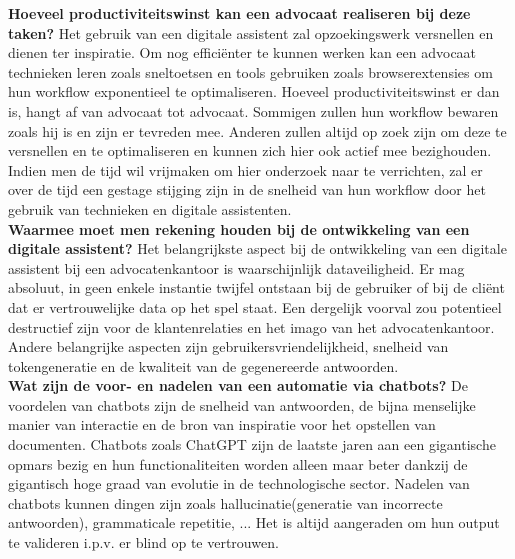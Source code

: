 \textbf{Hoeveel productiviteitswinst kan een advocaat realiseren bij deze taken?}
Het gebruik van een digitale assistent zal opzoekingswerk versnellen en dienen ter inspiratie.
Om nog efficiënter te kunnen werken kan een advocaat technieken leren zoals sneltoetsen en tools gebruiken zoals browserextensies om hun workflow exponentieel te optimaliseren.
Hoeveel productiviteitswinst er dan is, hangt af van advocaat tot advocaat.
Sommigen zullen hun workflow bewaren zoals hij is en zijn er tevreden mee.
Anderen zullen altijd op zoek zijn om deze te versnellen en te optimaliseren en kunnen zich hier ook actief mee bezighouden.
Indien men de tijd wil vrijmaken om hier onderzoek naar te verrichten, zal er over de tijd een gestage stijging
zijn in de snelheid van hun workflow door het gebruik van technieken en digitale assistenten. \\

\textbf{Waarmee moet men rekening houden bij de ontwikkeling van een digitale assistent?}
Het belangrijkste aspect bij de ontwikkeling van een digitale assistent bij een advocatenkantoor is waarschijnlijk dataveiligheid.
Er mag absoluut, in geen enkele instantie twijfel ontstaan bij de gebruiker of bij de cliënt dat er vertrouwelijke data op het spel staat.
Een dergelijk voorval zou potentieel destructief zijn voor de klantenrelaties en het imago van het advocatenkantoor.
Andere belangrijke aspecten zijn gebruikersvriendelijkheid, snelheid van tokengeneratie en de kwaliteit van de gegenereerde antwoorden.\\

\textbf{Wat zijn de voor- en nadelen van een automatie via chatbots?}
De voordelen van chatbots zijn de snelheid van antwoorden, de bijna menselijke manier van interactie en de bron van inspiratie voor het opstellen van documenten.
Chatbots zoals ChatGPT zijn de laatste jaren aan een gigantische opmars bezig en hun functionaliteiten worden alleen maar beter dankzij de gigantisch hoge graad van evolutie in de technologische sector.
Nadelen van chatbots kunnen dingen zijn zoals hallucinatie(generatie van incorrecte antwoorden), grammaticale repetitie, ...
Het is altijd aangeraden om hun output te valideren i.p.v. er blind op te vertrouwen.
